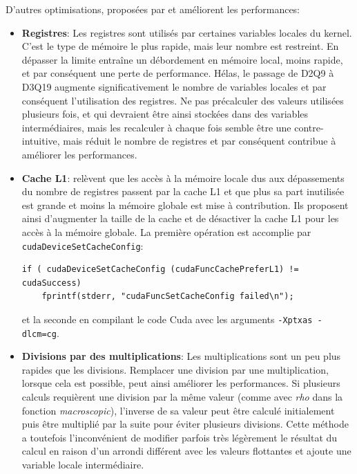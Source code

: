 D'autres optimisations, proposées par \citet{januszewski_sailfish_2014} et \citet{tran_performance_2017} améliorent les performances:
\begin{itemize}
\item \textbf{Registres}: Les registres sont utilisés par certaines variables locales du kernel. C'est le type de mémoire le plus rapide, mais leur nombre est restreint. En dépasser la limite entraîne un débordement en mémoire local, moins rapide, et par conséquent une perte de performance. Hélas, le passage de D2Q9 à D3Q19 augmente significativement le nombre de variables locales et par conséquent l'utilisation des registres. Ne pas précalculer des valeurs utilisées plusieurs fois, et qui devraient être ainsi stockées dans des variables intermédiaires, mais les recalculer à chaque fois semble être une  contre-intuitive, mais réduit le nombre de registres et par conséquent contribue à améliorer les performances.
\item \textbf{Cache L1}: \citet{januszewski_sailfish_2014} relèvent que les accès à la mémoire locale dus aux dépassements du nombre de registres passent par la cache L1 et que plus sa part inutilisée est grande et moins la mémoire globale est mise à contribution. Ils proposent ainsi d'augmenter la taille de la cache et de désactiver la cache L1 pour les accès à la mémoire globale. La première opération est accomplie par \texttt{cudaDeviceSetCacheConfig}:
\begin{lstlisting}[numbers=none]
if ( cudaDeviceSetCacheConfig (cudaFuncCachePreferL1) != cudaSuccess)
	fprintf(stderr, "cudaFuncSetCacheConfig failed\n");
\end{lstlisting}
et la seconde en compilant le code Cuda avec les arguments \texttt{-Xptxas -dlcm=cg}.
\item \textbf{Divisions par des multiplications}: Les multiplications sont un peu plus rapides que les divisions. Remplacer une division par une multiplication, lorsque cela est possible, peut ainsi améliorer les performances. Si plusieurs calculs requièrent une division par la même valeur (comme avec \textit{rho} dans la fonction \textit{macroscopic}), l'inverse de sa valeur peut être calculé initialement puis être multiplié par la suite pour éviter plusieurs divisions. Cette méthode a toutefois l'inconvénient de modifier parfois très légèrement le résultat du calcul en raison d'un arrondi différent avec les valeurs flottantes et ajoute une variable locale intermédiaire.
\end{itemize}

